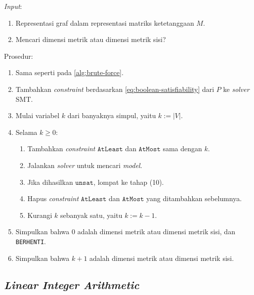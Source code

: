 \documentclass[10pt,twocolumn]{article}
\newcommand{\foreign}[1]{\foreignlanguage{english}{\textit{#1}}}
\def\AtLeast{\mathtt{AtLeast}}
\def\AtMost{\mathtt{AtMost}}
\def\unsat{\mathtt{unsat}}
\begin{document}
\begin{algorithm}[H]
	\foreign{Input}:
	\begin{enumerate}
		\item Representasi graf dalam representasi matriks ketetanggaan \(M\).
		\item Mencari dimensi metrik atau dimensi metrik sisi?
	\end{enumerate}
	Prosedur:
	\begin{enumerate}
		\item[1--5.] Sama seperti pada \autoref{alg:brute-force}.
		\setcounter{enumi}{5}
		\item Tambahkan \foreign{constraint} berdasarkan \autoref{eq:boolean-satisfiability} dari \(P\) ke \foreign{solver} SMT.
		\item Mulai variabel \(k\) dari banyaknya simpul, yaitu \(k := |V|\).
		\item Selama \(k \geq 0\):
			\begin{enumerate}
					\item Tambahkan \foreign{constraint} \(\AtLeast\) dan \(\AtMost\) sama dengan \(k\).
					\item Jalankan \foreign{solver} untuk mencari \foreign{model}.
					\item Jika dihasilkan \(\unsat\), lompat ke tahap (10).
					\item Hapus \foreign{constraint} \(\AtLeast\) dan \(\AtMost\) yang ditambahkan sebelumnya.
					\item Kurangi \(k\) sebanyak satu, yaitu \(k := k - 1\).
			\end{enumerate}
		\item Simpulkan bahwa 0 adalah dimensi metrik atau dimensi metrik sisi, dan \texttt{BERHENTI}.
		\item Simpulkan bahwa \(k + 1\) adalah dimensi metrik atau dimensi metrik sisi.
	\end{enumerate}
	\caption{\foreign{Boolean Satisfiability}}
	\label{alg:boolean-satisfiability}
\end{algorithm}

\subsection{\foreign{Linear Integer Arithmetic}}
\end{document}
